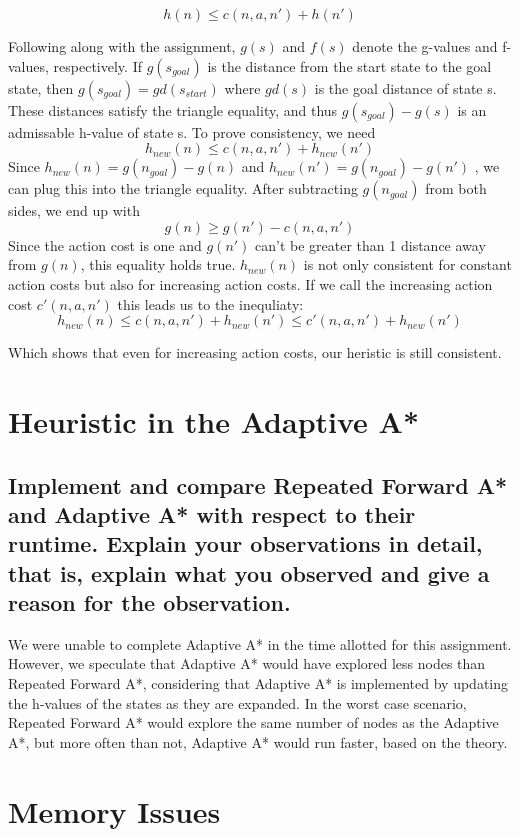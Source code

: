 \documentclass[paper=a4, fontsize=11pt]{scrartcl} %
\begin{document}
\[h(n) \leq c(n, a, n' ) + h(n')  \]   

Following along with the assignment, $g(s)$ and $f(s)$ denote the g-values and f-values, respectively. If $g(s_{goal})$ is the distance from the start state to the goal state, then $g(s_{goal}) = gd(s_{start})$ where $gd(s)$ is the goal distance of state s. These distances satisfy the triangle equality, and thus $g(s_{goal}) - g(s)$ is an admissable h-value of state s.
To prove consistency, we need
\[h_{new}(n) \leq c(n,a,n') + h_{new}(n') \]
Since $h_{new}(n) = g(n_{goal}) - g(n)$ and $h_{new}(n') = g(n_{goal}) - g(n')$ , we can plug this into the triangle equality. After subtracting $g(n_{goal})$ from both sides, we end up with
\[g(n) \geq g(n') - c(n,a,n') \]
Since the action cost is one and $g(n')$ can't be greater than 1 distance away from $g(n)$, this equality holds true. $h_{new}(n)$ is not only consistent for constant action costs but also for increasing action costs. If we call the increasing action cost $c'(n,a,n')$ this leads us to the inequliaty:
\[ h_{new}(n) \leq c(n,a,n') + h_{new}(n') \leq c'(n,a,n') + h_{new}(n') \]

Which shows that even for increasing action costs, our heristic is still consistent. 




\section{Heuristic in the Adaptive A*}
\subsection*{Implement and compare Repeated Forward A* and Adaptive A*
with respect to their runtime. Explain your observations in detail, that is, explain what you observed and give a reason for the observation.}

We were unable to complete Adaptive A* in the time allotted for this assignment. However, we speculate that Adaptive A* would have explored less nodes than Repeated Forward A*, considering that Adaptive A* is implemented by updating the h-values of the states as they are expanded. In the worst case scenario, Repeated Forward A* would explore the same number of nodes as the Adaptive A*, but more often than not, Adaptive A* would run faster, based on the theory. 


\section{Memory Issues}
\end{document}
